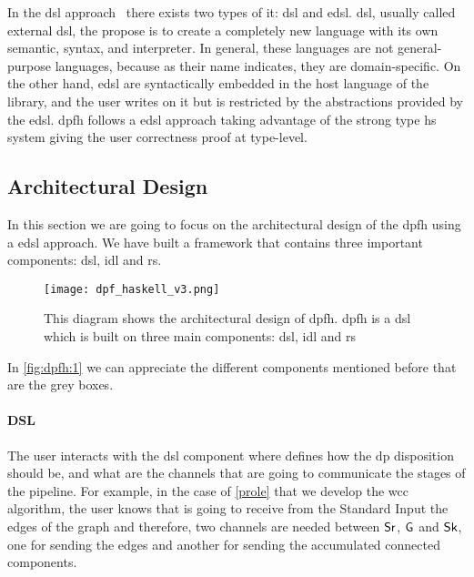 In the \acrfull{dsl} approach~\cite{dsl} there exists two types of it: \acrfull{dsl} and \acrfull{edsl}. \acrshort{dsl}, usually called external \acrshort{dsl}, the propose is to create a completely new language with its own semantic, syntax, and interpreter. 
In general, these languages are not general-purpose languages, because as their name indicates, they are domain-specific. On the other hand, \acrshort{edsl} are syntactically embedded in the host language of the library, and the user writes on it but is restricted by the abstractions provided by the \acrshort{edsl}.
\acrshort{dpfh} follows a \acrshort{edsl} approach taking advantage of the strong type \acrshort{hs} system giving the user correctness proof at type-level.

\subsection{Architectural Design}
In this section we are going to focus on the architectural design of the \acrshort{dpfh} using a \acrshort{edsl} approach. We have built a framework that contains
three important components: \acrshort{dsl}, \acrshort{idl} and \acrshort{rs}. 

\begin{figure}[!ht]
  \centering
  \begin{minipage}{\textwidth}
   \texttt{[image: dpf\_haskell\_v3.png]}
    \caption[{[\acrshort{dpfh}] Architectural design of \acrshort{dpfh}}]{This diagram shows the architectural design of \acrshort{dpfh}. \acrshort{dpfh} is a \acrshort{dsl} which is built on three main components: \acrshort{dsl}, \acrshort{idl} and \acrshort{rs}}
    \label{fig:dpfh:1}
  \end{minipage}
\end{figure}

In \autoref{fig:dpfh:1} we can appreciate the different components mentioned before that are the grey boxes.

\paragraph{DSL} The user interacts with the \acrshort{dsl} component where defines how the \acrshort{dp} disposition
should be, and what are the channels that are going to communicate the stages of the pipeline. For example, in the
case of \autoref{prole} that we develop the \acrshort{wcc} algorithm, the user knows that is going to receive from the Standard Input 
the edges of the graph and therefore, two channels are needed between $\mathsf{Sr}$, $\mathsf{G}$ and $\mathsf{Sk}$, one for sending the edges and another for sending
the accumulated connected components. 


